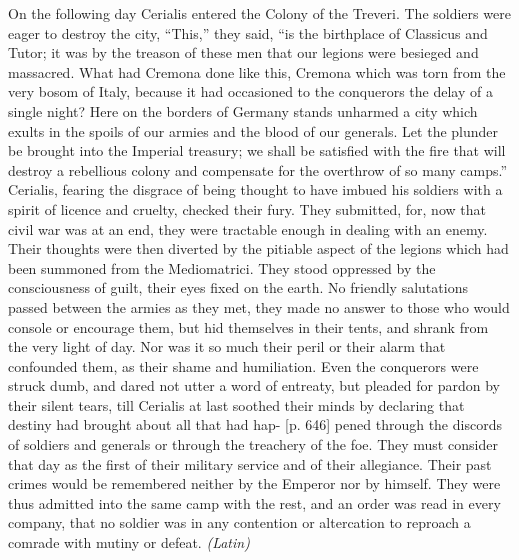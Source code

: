 On the following day Cerialis entered the Colony of the Treveri. The soldiers were eager to destroy the city, ``This,'' they said, ``is the birthplace of Classicus and Tutor; it was by the treason of these men that our legions were besieged and massacred. What had Cremona done like this, Cremona which was torn from the very bosom of Italy, because it had occasioned to the conquerors the delay of a single night? Here on the borders of Germany stands unharmed a city which exults in the spoils of our armies and the blood of our generals. Let the plunder be brought into the Imperial treasury; we shall be satisfied with the fire that will destroy a rebellious colony and compensate for the overthrow of so many camps.'' Cerialis, fearing the disgrace of being thought to have imbued his soldiers with a spirit of licence and cruelty, checked their fury. They submitted, for, now that civil war was at an end, they were tractable enough in dealing with an enemy. Their thoughts were then diverted by the pitiable aspect of the legions which had been summoned from the Mediomatrici. They stood oppressed by the consciousness of guilt, their eyes fixed on the earth. No friendly salutations passed between the armies as they met, they made no answer to those who would console or encourage them, but hid themselves in their tents, and shrank from the very light of day. Nor was it so much their peril or their alarm that confounded them, as their shame and humiliation. Even the conquerors were struck dumb, and dared not utter a word of entreaty, but pleaded for pardon by their silent tears, till Cerialis at last soothed their minds by declaring that destiny had brought about all that had hap- [p. 646] pened through the discords of soldiers and generals or through the treachery of the foe. They must consider that day as the first of their military service and of their allegiance. Their past crimes would be remembered neither by the Emperor nor by himself. They were thus admitted into the same camp with the rest, and an order was read in every company, that no soldier was in any contention or altercation to reproach a comrade with mutiny or defeat. \emph{(Latin)}


